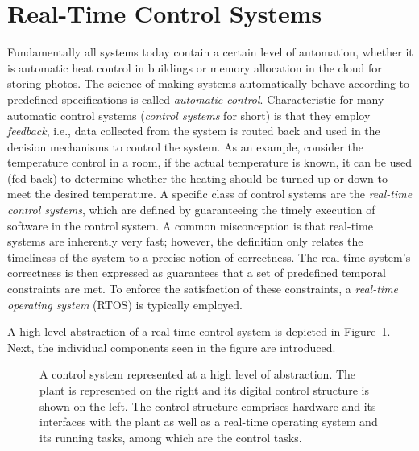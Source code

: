 \section{Real-Time Control Systems}%
\label{sec:intro:rts}%
%
Fundamentally all systems today contain a certain level of automation, whether it is automatic heat control in buildings or memory allocation in the cloud for storing photos.
The science of making systems automatically behave according to predefined specifications is called \emph{automatic control}.
Characteristic for many automatic control systems (\emph{control systems} for short) is that they employ \emph{feedback}, i.e., data collected from the system is routed back and used in the decision mechanisms to control the system.
As an example, consider the temperature control in a room, if the actual temperature is known, it can be used (fed back) to determine whether the heating should be turned up or down to meet the desired temperature.
A specific class of control systems are the \emph{real-time control systems}, which are defined by guaranteeing the timely execution of software in the control system.
A common misconception is that real-time systems are inherently very fast; however, the definition only relates the timeliness of the system to a precise notion of correctness.
The real-time system's correctness is then expressed as guarantees that a set of predefined temporal constraints are met.
To enforce the satisfaction of these constraints, a \emph{real-time operating system} (RTOS) is typically employed.

A high-level abstraction of a real-time control system is depicted in Figure~\ref{fig:high-level-abstraction}.
Next, the individual components seen in the figure are introduced. 
%
\begin{figure}[t]
    \centering
    \caption{A control system represented at a high level of abstraction.
    The plant is represented on the right and its digital control structure is shown on the left.
    The control structure comprises hardware and its interfaces with the plant as well as a real-time operating system and its running tasks, among which are the control tasks.}%
    \label{fig:high-level-abstraction}%
\end{figure}


